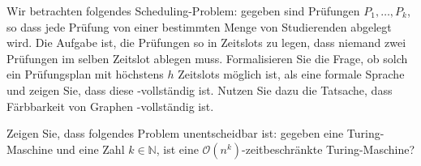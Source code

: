 \documentclass[german]{latteachCD}[2017/03/28]
\begin{document}
\begin{exercise}
  Wir betrachten folgendes Scheduling-Problem: gegeben sind Prüfungen $P_{1},
  \ldots, P_{k}$, so dass jede Prüfung von einer bestimmten Menge von
  Studierenden abgelegt wird.  Die Aufgabe ist, die Prüfungen so in Zeitslots zu
  legen, dass niemand zwei Prüfungen im selben Zeitslot ablegen muss.
  Formalisieren Sie die Frage, ob solch ein Prüfungsplan mit höchstens $h$
  Zeitslots möglich ist, als eine formale Sprache und zeigen Sie, dass diese
  \NP-vollständig ist.  Nutzen Sie dazu die Tatsache, dass Färbbarkeit von
  Graphen \NP-vollständig ist.
\end{exercise}

\begin{exercise}
  Zeigen Sie, dass folgendes Problem unentscheidbar ist: gegeben eine
  Turing-Maschine  und eine Zahl $k \in \mathbb N$, ist  eine
  $\mathcal{O}(n^{k})$-zeitbeschränkte Turing-Maschine?
\end{exercise}

\end{document}
